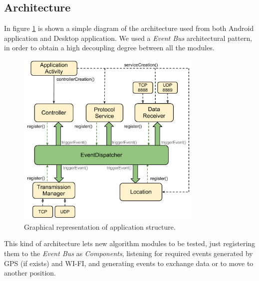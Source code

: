 \subsection{Architecture}

In figure \ref{fig:architecture} is shown a simple diagram of the architecture used from both Android application and Desktop application. We used a \textit{Event Bus} architectural pattern, in order to obtain a high decoupling degree between all the modules.

\begin{figure}[htbp]
	\centering
	\includegraphics[trim = 10mm 0mm 0mm 0mm,width=3.5in]{imgs/components_architecture.pdf}
	\caption{Graphical representation of application structure.}
	\label{fig:architecture}
\end{figure}

This kind of architecture lets new algorithm modules to be tested, just registering them to the \textit{Event Bus} as \textit{Components}, listening for required events generated by GPS (if exists) and WI-FI, and generating events to exchange data or to move to another position.

